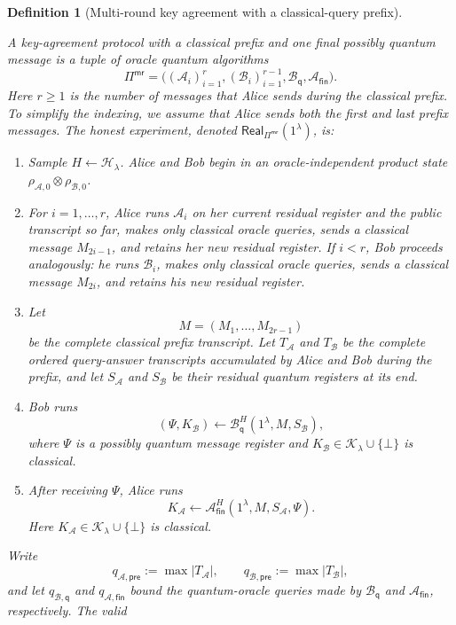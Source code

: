 \documentclass[11pt]{article}
\newcounter{algorithm}
\newtheorem{definition}[definition]{Definition}
\newcommand{\cA}{\mathcal{A}}
\newcommand{\cB}{\mathcal{B}}
\newcommand{\cH}{\mathcal{H}}
\newcommand{\cK}{\mathcal{K}}
\newcommand{\Real}{\mathsf{Real}}
\begin{document}
\begin{definition}[Multi-round key agreement with a classical-query prefix]\label{def:multi-protocol}

A key-agreement protocol with a classical prefix and one final possibly
quantum message is a tuple of oracle quantum algorithms
\[
  \Pi^{\mathsf{mr}}
  =
  \bigl((\cA_i)_{i=1}^{r},(\cB_i)_{i=1}^{r-1},
    \cB_{\mathsf q},\cA_{\mathsf{fin}}\bigr).
\]
Here \(r\ge1\) is the number of messages that Alice sends during the
classical prefix. To simplify the indexing, we assume that Alice sends both
the first and last prefix messages.
The honest experiment, denoted
\(\Real_{\Pi^{\mathsf{mr}}}(1^\lambda)\), is:
\begin{enumerate}[leftmargin=2em]
  \item Sample \(H\leftarrow\cH_\lambda\). Alice and Bob begin in an
  oracle-independent product state
  \(\rho_{\cA,0}\otimes\rho_{\cB,0}\).
  \item For \(i=1,\ldots,r\), Alice runs \(\cA_i\) on her current residual
  register and the public transcript so far, makes only classical oracle
  queries, sends a classical message \(M_{2i-1}\), and retains her new
  residual register. If \(i<r\), Bob proceeds analogously: he runs
  \(\cB_i\), makes only classical oracle queries, sends a classical message
  \(M_{2i}\), and retains his new residual register.
  \item Let
  \[
    M=(M_1,\ldots,M_{2r-1})
  \]
  be the complete classical prefix transcript. Let \(T_{\cA}\) and
  \(T_{\cB}\) be the complete ordered query-answer transcripts accumulated by
  Alice and Bob during the prefix, and let \(S_{\cA}\) and \(S_{\cB}\) be
  their residual quantum registers at its end.
  \item Bob runs
  \[
    (\Psi,K_{\cB})
    \leftarrow
    \cB_{\mathsf q}^{H}
    (1^\lambda,M,S_{\cB}),
  \]
  where \(\Psi\) is a possibly quantum message register and
  \(K_{\cB}\in\cK_\lambda\cup\{\bot\}\) is classical.
  \item After receiving \(\Psi\), Alice runs
  \[
    K_{\cA}
    \leftarrow
    \cA_{\mathsf{fin}}^{H}
    (1^\lambda,M,S_{\cA},\Psi).
  \]
  Here \(K_{\cA}\in\cK_\lambda\cup\{\bot\}\) is classical.
\end{enumerate}
Write
\[
  q_{\cA,\mathsf{pre}}
  :=\max |T_{\cA}|,
  \qquad
  q_{\cB,\mathsf{pre}}
  :=\max |T_{\cB}|,
\]
and let \(q_{\cB,\mathsf q}\) and
\(q_{\cA,\mathsf{fin}}\) bound the quantum-oracle queries made by
\(\cB_{\mathsf q}\) and \(\cA_{\mathsf{fin}}\), respectively. The valid

\end{definition}
\end{document}
